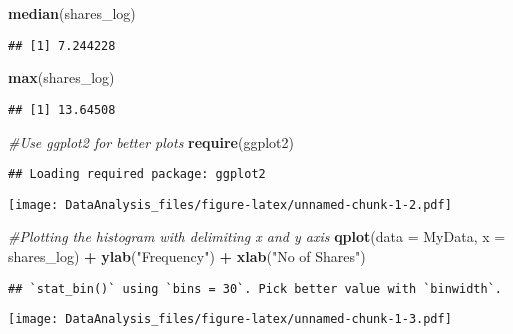 \documentclass[]{article}
\newenvironment{Shaded}{\begin{snugshade}}{\end{snugshade}}
\newcommand{\KeywordTok}[1]{\textcolor[rgb]{0.13,0.29,0.53}{\textbf{#1}}}
\newcommand{\DataTypeTok}[1]{\textcolor[rgb]{0.13,0.29,0.53}{#1}}
\newcommand{\StringTok}[1]{\textcolor[rgb]{0.31,0.60,0.02}{#1}}
\newcommand{\CommentTok}[1]{\textcolor[rgb]{0.56,0.35,0.01}{\textit{#1}}}
\newcommand{\OperatorTok}[1]{\textcolor[rgb]{0.81,0.36,0.00}{\textbf{#1}}}
\newcommand{\NormalTok}[1]{#1}
\begin{document}
\begin{Shaded}
\begin{Highlighting}[]
\KeywordTok{median}\NormalTok{(shares_log)}
\end{Highlighting}
\end{Shaded}

\begin{verbatim}
## [1] 7.244228
\end{verbatim}

\begin{Shaded}
\begin{Highlighting}[]
\KeywordTok{max}\NormalTok{(shares_log)}
\end{Highlighting}
\end{Shaded}

\begin{verbatim}
## [1] 13.64508
\end{verbatim}

\begin{Shaded}
\begin{Highlighting}[]
\CommentTok{#Use ggplot2 for better plots}
\KeywordTok{require}\NormalTok{(ggplot2)}
\end{Highlighting}
\end{Shaded}

\begin{verbatim}
## Loading required package: ggplot2
\end{verbatim}

\texttt{[image: DataAnalysis\_files/figure-latex/unnamed-chunk-1-2.pdf]}

\begin{Shaded}
\begin{Highlighting}[]
\CommentTok{#Plotting the histogram with delimiting x and y axis}
\KeywordTok{qplot}\NormalTok{(}\DataTypeTok{data =}\NormalTok{ MyData, }\DataTypeTok{x =}\NormalTok{ shares_log) }\OperatorTok{+}\StringTok{ }\KeywordTok{ylab}\NormalTok{(}\StringTok{"Frequency"}\NormalTok{) }\OperatorTok{+}\StringTok{ }\KeywordTok{xlab}\NormalTok{(}\StringTok{"No of Shares"}\NormalTok{)}
\end{Highlighting}
\end{Shaded}

\begin{verbatim}
## `stat_bin()` using `bins = 30`. Pick better value with `binwidth`.
\end{verbatim}

\texttt{[image: DataAnalysis\_files/figure-latex/unnamed-chunk-1-3.pdf]}
\end{document}
